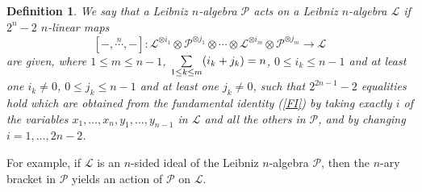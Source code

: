 \documentclass[12pt, reqno]{amsart}
\newtheorem{definition}{Definition}[section]
\begin{document}
\begin{definition}\label{Def action} We say that a Leibniz $n$-algebra $\mathcal{P}$ acts on
a Leibniz $n$-algebra $\mathcal{L}$ if $2^n-2$ $n$-linear maps
\[
[-,\stackrel{n}{\cdots},-]:\mathcal{L}^{\otimes i_1}\otimes \mathcal{P}^{\otimes
j_1}\otimes\cdots\otimes \mathcal{L}^{\otimes i_m}\otimes
\mathcal{P}^{\otimes j_m}\to \mathcal{L}
\]
are given, where $1\leq m\leq n-1$, $\underset{\scriptsize{1\leq
k\leq m}}\sum (i_k+j_k)=n$, $0\leq i_k \leq n-1$ and at least one
$i_k\neq 0$, $0\leq j_k \leq n-1$ and at least one $j_k\neq 0$,
such that $2^{2n-1}-2$ equalities hold which are obtained from the fundamental identity
(\ref{FI}) by taking exactly $i$ of the variables
$x_1,\dots,x_n,y_1,\dots, y_{n-1}$ in $\mathcal{L}$ and all the
others in $\mathcal{P}$, %
and by changing $i=1,\dots,2n-2$.

\end{definition}

For example, if $\mathcal{L}$ is an $n$-sided ideal of the Leibniz $n$-algebra $\mathcal{P}$, then the
$n$-ary bracket in $\mathcal{P}$ yields an action of $\mathcal{P}$ on $\mathcal{L}$.
\end{document}
